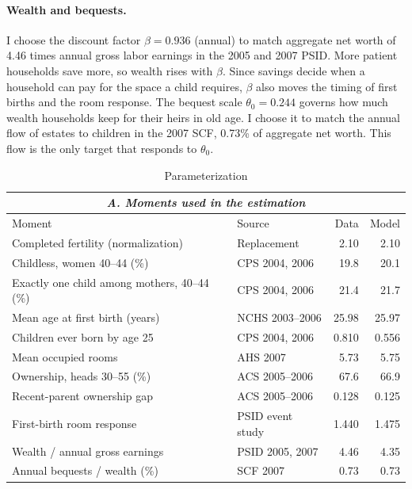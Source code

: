 \paragraph{Wealth and bequests.}
I choose the discount factor $\beta=0.936$ (annual) to match aggregate net
worth of 4.46 times annual gross labor earnings in the 2005 and 2007 PSID.
More patient households save more, so wealth rises with $\beta$. Since
savings decide when a household can pay for the space a child requires,
$\beta$ also moves the timing of first births and the room response. The
bequest scale $\theta_0=0.244$ governs how much wealth households keep for
their heirs in old age. I choose it to match the annual flow of estates to
children in the 2007 SCF, 0.73\% of aggregate net worth. This flow is the
only target that responds to $\theta_0$.

\begin{table}[!tbp]
\centering
\caption{Parameterization}
\label{tab:quant-parameters}
\small
\begin{tabularx}{\textwidth}{@{}X l r r@{}}
\multicolumn{4}{c}{\textit{A. Moments used in the estimation}}\\
\toprule
Moment & Source & Data & Model \\
\midrule
Completed fertility (normalization) & Replacement & 2.10 & 2.10 \\
Childless, women 40--44 (\%) & CPS 2004, 2006 & 19.8 & 20.1 \\
Exactly one child among mothers, 40--44 (\%) & CPS 2004, 2006 & 21.4 & 21.7 \\
Mean age at first birth (years) & NCHS 2003--2006 & 25.98 & 25.97 \\
Children ever born by age 25 & CPS 2004, 2006 & 0.810 & 0.556 \\
Mean occupied rooms & AHS 2007 & 5.73 & 5.75 \\
Ownership, heads 30--55 (\%) & ACS 2005--2006 & 67.6 & 66.9 \\
Recent-parent ownership gap & ACS 2005--2006 & 0.128 & 0.125 \\
First-birth room response & PSID event study & 1.440 & 1.475 \\
Wealth / annual gross earnings & PSID 2005, 2007 & 4.46 & 4.35 \\
Annual bequests / wealth (\%) & SCF 2007 & 0.73 & 0.73 \\
\bottomrule
\end{tabularx}


\end{table}
